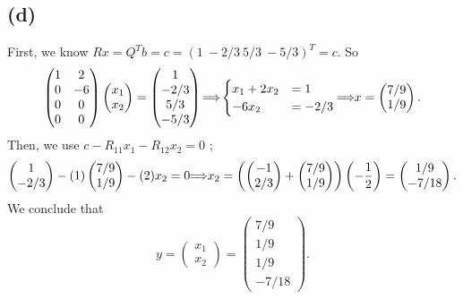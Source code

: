 \documentclass[12pt]{article}
\let\oldimplies\implies
\renewcommand*{\implies}{
	\hspace{-0.05cm}\resizebox{.95\width}{\height}{$\oldimplies$}\hspace{-0.05cm}
}
\begin{document}
		\subsection*{(d)}
			First, we know $Rx = Q^{T} b = c = (1 \ -2/3  \ 5/3 \  -5/3)^{T} =c$. So 
			$$ \begin{pmatrix}
				1 & 2 \\ 0 & -6 \\ 0 & 0 \\ 0 & 0 
			\end{pmatrix} \begin{pmatrix}
			x_1 \\ x_2
			\end{pmatrix} = \begin{pmatrix}
			1 \\ -2/3 \\ 5/3 \\ -5/3
			\end{pmatrix} \implies 
			\begin{cases}
				x_{1} + 2x_{2} &=1 \\
				-6x_{2} &= -2/3 
			\end{cases} \implies x = \begin{pmatrix}
				7/9 \\ 1/9
			\end{pmatrix}.$$
			Then, we use $c - R_{11}x_{1}- R_{12}x_{2} =0$ ; 
			\begin{gather*}
				\begin{pmatrix}
					1 \\ -2/3 
				\end{pmatrix} - (1) \begin{pmatrix}
				7/9 \\ 1/9
				\end{pmatrix}
				- (2) x_2 = 0 \implies x_{2} = \left(\begin{pmatrix}
				-1 \\ 2/3
				\end{pmatrix} + \begin{pmatrix}
				7/9 \\ 1/9
				\end{pmatrix}\right)\left(-\frac12\right) = \begin{pmatrix}
					1/9 \\ -7/18
				\end{pmatrix}.
			\end{gather*}   
			We conclude that 
			$$ y = \begin{pmatrix}
				x_1 \\ x_2
			\end{pmatrix} = \begin{pmatrix}
				7/9 \\ 1/9 \\ 1/9 \\ -7/18
			\end{pmatrix}.$$
\end{document}
